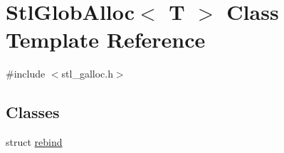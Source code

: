 \hypertarget{classStlGlobAlloc}{\section{Stl\-Glob\-Alloc$<$ T $>$ Class Template Reference}
\label{classStlGlobAlloc}
}


{\ttfamily \#include $<$stl\-\_\-galloc.\-h$>$}

\subsection*{Classes}
\begin{DoxyCompactItemize}
\item 
struct \hyperlink{structStlGlobAlloc_1_1rebind}{rebind}
\end{DoxyCompactItemize}

